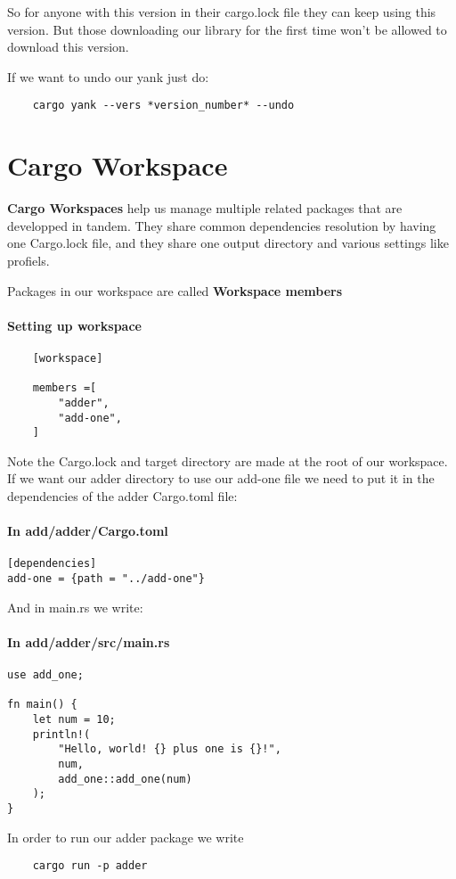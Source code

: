 So for anyone with this version in their cargo.lock file they can keep using this version. But those downloading our library for the first time won't be allowed to download this version.

If we want to undo our yank just do:\begin{lstlisting}
    cargo yank --vers *version_number* --undo
\end{lstlisting}

\section{Cargo Workspace}

\begin{definition}
    \textbf{Cargo Workspaces} help us manage multiple related packages that are developped in tandem. They share common dependencies resolution by having one Cargo.lock file, and they share one output directory and various settings like profiels.
\end{definition}

\begin{definition}
    Packages in our workspace are called \textbf{Workspace members}
\end{definition}

\paragraph*{Setting up workspace}\begin{lstlisting}
    [workspace]

    members =[
        "adder",
        "add-one",
    ]\end{lstlisting}

Note the Cargo.lock and target directory are made at the root of our workspace. If we want our adder directory to use our add-one file we need to put it in the dependencies of the adder Cargo.toml file:
\paragraph*{In add/adder/Cargo.toml}\begin{lstlisting}
[dependencies]
add-one = {path = "../add-one"}
\end{lstlisting}

And in main.rs we write:

\paragraph*{In add/adder/src/main.rs}\begin{lstlisting}
use add_one;

fn main() {
    let num = 10;
    println!(
        "Hello, world! {} plus one is {}!",
        num,
        add_one::add_one(num)
    );
}
\end{lstlisting}
In order to run our adder package we write \begin{lstlisting}
    cargo run -p adder
\end{lstlisting}


